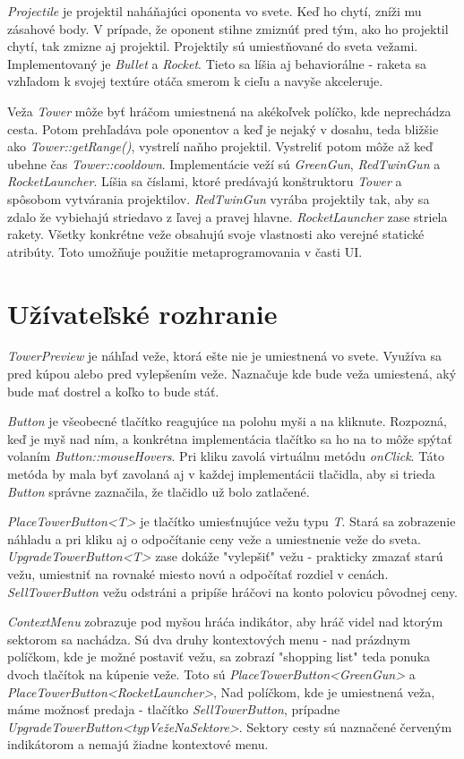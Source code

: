 \documentclass[12pt]{article}
\begin{document}
\emph{Projectile} je projektil naháňajúci oponenta vo svete. Keď ho chytí, zníži mu zásahové body. V prípade, že oponent stihne zmiznúť
pred tým, ako ho projektil chytí, tak zmizne aj projektil. Projektily sú umiestňované do sveta vežami.
Implementovaný je \emph{Bullet} a \emph{Rocket}. Tieto sa líšia aj behaviorálne - raketa sa vzhľadom k svojej textúre otáča smerom k cieľu
a navyše akceleruje.


Veža \emph{Tower} môže byť hráčom umiestnená na akékoľvek políčko, kde neprechádza cesta. Potom prehľadáva pole oponentov
a keď je nejaký v dosahu, teda bližšie ako \emph{Tower::getRange()}, vystrelí naňho projektil. Vystreliť potom môže až keď
ubehne čas \emph{Tower::cooldown}. Implementácie veží sú \emph{GreenGun}, \emph{RedTwinGun} a \emph{RocketLauncher}. Líšia sa
číslami, ktoré predávajú konštruktoru \emph{Tower} a spôsobom vytvárania projektilov. \emph{RedTwinGun} vyrába projektily tak,
aby sa zdalo že vybiehajú striedavo z ľavej a pravej hlavne. \emph{RocketLauncher} zase striela rakety.
Všetky konkrétne veže obsahujú svoje vlastnosti ako verejné statické atribúty. Toto umožňuje použitie metaprogramovania v časti UI.

\section{Užívateľské rozhranie}

\emph{TowerPreview} je náhľad veže, ktorá ešte nie je umiestnená vo svete. Využíva sa pred kúpou alebo pred vylepšením veže.
Naznačuje kde bude veža umiestená, aký bude mať dostrel a koľko to bude stáť.


\emph{Button} je všeobecné tlačítko reagujúce na polohu myši a na kliknute. Rozpozná, keď je myš nad ním, a konkrétna implementácia
tlačítko sa ho na to môže spýtať volaním \emph{Button::mouseHovers}. Pri kliku zavolá virtuálnu metódu \emph{onClick}. Táto metóda by mala
byť zavolaná aj v každej implementácii tlačidla, aby si trieda \emph{Button} správne zaznačila, že tlačidlo už bolo zatlačené.


\emph{PlaceTowerButton<T>} je tlačítko umiesťnujúce vežu typu \emph{T}. Stará sa zobrazenie náhladu a pri kliku aj o odpočítanie ceny veže
a umiestnenie veže do sveta. \emph{UpgradeTowerButton<T>} zase dokáže "vylepšiť" vežu - prakticky zmazať starú vežu, umiestniť na rovnaké miesto
novú a odpočítať rozdiel v cenách. \emph{SellTowerButton} vežu odstráni a pripíše hráčovi na konto polovicu pôvodnej ceny.  


\emph{ContextMenu} zobrazuje pod myšou hráća indikátor, aby hráč videl nad ktorým sektorom sa nachádza.
Sú dva druhy kontextových menu - nad prázdnym políčkom, kde je možné postaviť vežu, sa zobrazí "shopping list"
teda ponuka dvoch tlačítok na kúpenie veže. Toto sú \emph{PlaceTowerButton<GreenGun>} a \emph{PlaceTowerButton<RocketLauncher>},
Nad políčkom, kde je umiestnená veža, máme možnosť predaja - tlačítko \emph{SellTowerButton}, prípadne \emph{UpgradeTowerButton<typVežeNaSektore>}.
Sektory cesty sú naznačené červeným indikátorom a nemajú žiadne kontextové menu.
\end{document}
